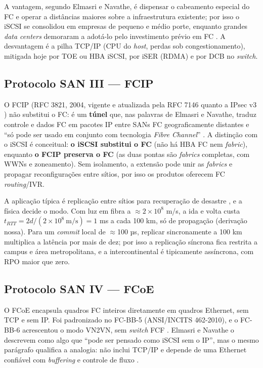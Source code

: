 \documentclass[11pt,a4paper]{article}
\begin{document}
A vantagem, segundo Elmasri e Navathe, é dispensar o cabeamento especial do FC e operar a distâncias
maiores sobre a infraestrutura existente; por isso o iSCSI se consolidou em empresas de pequeno e médio
porte, enquanto grandes \textit{data centers} demoraram a adotá-lo pelo investimento prévio em FC
\cite{elmasri2018}. A desvantagem é a pilha TCP/IP (CPU do \textit{host}, perdas sob congestionamento),
mitigada hoje por TOE ou HBA iSCSI, por iSER (RDMA) e por DCB no \textit{switch}.

\subsection{Protocolo SAN III --- FCIP}
\label{sec:fcip}

O FCIP (RFC 3821, 2004, vigente e atualizada pela RFC 7146 quanto a IPsec v3 \cite{rfc3821,rfc7146}) não
substitui o FC: é um \textbf{túnel} que, nas palavras de Elmasri e Navathe, traduz controle e dados FC em
pacotes IP entre SANs FC geograficamente distantes e ``só pode ser usado em conjunto com tecnologia
\textit{Fibre Channel}'' \cite{elmasri2018}. A distinção com o iSCSI é conceitual: \textbf{o iSCSI
substitui o FC} (não há HBA FC nem \textit{fabric}), enquanto \textbf{o FCIP preserva o FC} (as duas
pontas são \textit{fabrics} completas, com WWNs e zoneamento). Sem isolamento, a extensão pode unir as
\textit{fabrics} e propagar reconfigurações entre sítios, por isso os produtos oferecem FC
\textit{routing}/IVR.

A aplicação típica é replicação entre sítios para recuperação de desastre \cite{elmasri2018}, e a física
decide o modo. Com luz em fibra a $\approx 2 \times 10^{8}$ m/s, a ida e volta custa
$t_{RTT} = 2d / (2 \times 10^{8}\ \text{m/s}) = 1$ ms a cada 100 km, só de propagação (derivação nossa).
Para um \textit{commit} local de $\approx$100 µs, replicar sincronamente a 100 km multiplica a latência
por mais de dez; por isso a replicação síncrona fica restrita a campus e área metropolitana, e a
intercontinental é tipicamente assíncrona, com RPO maior que zero.

\subsection{Protocolo SAN IV --- FCoE}
\label{sec:fcoe}

O FCoE encapsula quadros FC inteiros diretamente em quadros Ethernet, sem TCP e sem IP. Foi padronizado
no FC-BB-5 (ANSI/INCITS 462-2010), e o FC-BB-6 acrescentou o modo VN2VN, sem \textit{switch} FCF
\cite{fcbb5}. Elmasri e Navathe o descrevem como algo que ``pode ser pensado como iSCSI sem o IP'', mas o
mesmo parágrafo qualifica a analogia: não inclui TCP/IP e depende de uma Ethernet confiável com
\textit{buffering} e controle de fluxo \cite{elmasri2018}.
\end{document}
